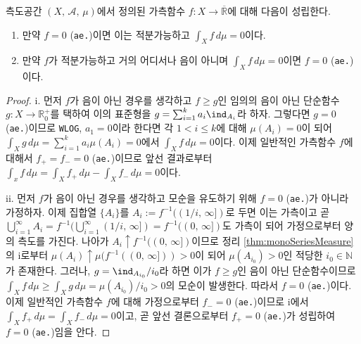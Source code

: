 \begin{theorem}\label{thm:zeroAeIntegral}
    측도공간 $(X,\,\mathcal{A},\,\mu)$에서 정의된 가측함수 $f:X\to\overline{\mathbb{R}}$에 대해 다음이 성립한다.
    \begin{enumerate}
        \item 만약 $f=0$ (\texttt{ae.})이면 이는 적분가능하고 $\int_Xf\,d\mu=0$이다.
        \item 만약 $f$가 적분가능하고 거의 어디서나 음이 아니며 $\int_Xf\,d\mu=0$이면 $f=0$ (\texttt{ae.})이다.
    \end{enumerate}
\end{theorem}

\begin{proof}
    i. 먼저 $f$가 음이 아닌 경우를 생각하고 $f\geq g$인 임의의 음이 아닌 단순함수 $g:X\to\mathbb{R}^+_0$를 택하여 이의 표준형을 $g=\sum_{i=1}^ka_i\ind_{A_i}$라 하자. 그렇다면 $g=0$ (\texttt{ae.})이므로 \texttt{WLOG}, $a_1=0$이라 한다면 각 $1<i\leq k$에 대해 $\mu(A_i)=0$이 되어 $\int_Xg\,d\mu=\sum_{i=1}^ka_i\mu(A_i)=0$에서 $\int_Xf\,d\mu=0$이다. 이제 일반적인 가측함수 $f$에 대해서 $f_+=f_-=0$ (\texttt{ae.})이므로 앞선 결과로부터 $\int_xf\,d\mu=\int_Xf_+\,d\mu-\int_Xf_-\,d\mu=0$이다.

    ii. 먼저 $f$가 음이 아닌 경우를 생각하고 모순을 유도하기 위해 $f=0$ (\texttt{ae.})가 아니라 가정하자. 이제 집합열 $\{A_i\}$를 $A_i:=f^{-1}((1/i,\,\infty])$로 두면 이는 가측이고 곧 $\bigcup_{i=1}^\infty A_i=f^{-1}(\bigcup_{i=1}^\infty(1/i,\,\infty])=f^{-1}((0,\,\infty])$도 가측이 되어 가정으로부터 양의 측도를 가진다. 나아가 $A_i\uparrow f^{-1}((0,\,\infty])$이므로 정리 \ref{thm:monoSeriesMeasure}의 i로부터 $\mu(A_i)\uparrow\mu(f^{-1}((0,\,\infty]))>0$이 되어 $\mu(A_{i_0})>0$인 적당한 $i_0\in\mathbb{N}$가 존재한다. 그러나, $g=\ind_{A_{i_0}}/i_0$라 하면 이가 $f\geq g$인 음이 아닌 단순함수이므로 $\int_Xf\,d\mu\geq\int_Xg\,d\mu=\mu(A_{i_0})/i_0>0$의 모순이 발생한다. 따라서 $f=0$ (\texttt{ae.})이다. 이제 일반적인 가측함수 $f$에 대해 가정으로부터 $f_-=0$ (\texttt{ae.})이므로 i에서 $\int_Xf_+\,d\mu=\int_Xf_-\,d\mu=0$이고, 곧 앞선 결론으로부터 $f_+=0$ (\texttt{ae.})가 성립하여 $f=0$ (\texttt{ae.})임을 안다.
\end{proof}

